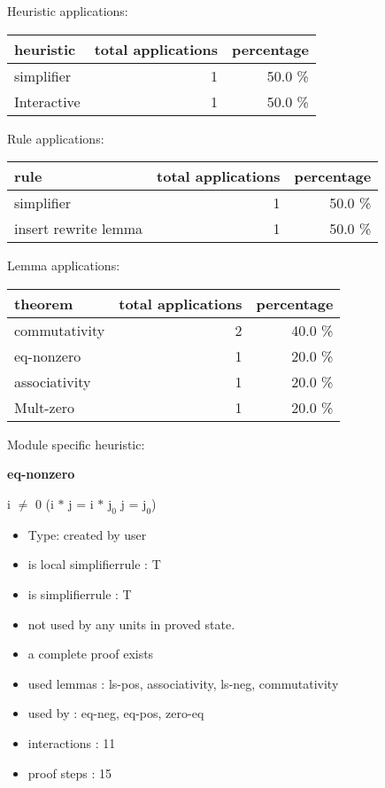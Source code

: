 \documentclass[a4paper]{article}
\begin{document}
\medskip


Heuristic applications:

\begin{supertabular}{l|r|r}
heuristic	& total applications & percentage \\ \hline
simplifier & 1 & 50.0 \% \\
Interactive & 1 & 50.0 \% \\

\end{supertabular}

Rule applications:

\begin{supertabular}{l|r|r}
rule	        & total applications & percentage \\ \hline
simplifier & 1 & 50.0 \% \\
insert rewrite lemma & 1 & 50.0 \% \\

\end{supertabular}

Lemma applications:

\begin{supertabular}{l|r|r}
theorem	        & total applications & percentage \\ \hline
commutativity & 2 & 40.0 \% \\
eq-nonzero & 1 & 20.0 \% \\
associativity & 1 & 20.0 \% \\
Mult-zero & 1 & 20.0 \% \\

\end{supertabular}

Module specific heuristic:

\pagebreak

{\LARGE\bf eq-nonzero}\label{lemma-eq-nonzero}

\medskip

 \Fol i $\neq$ 0 \Imp (i $*$ j = i $*$ $\mbox{j}_{0}$ \Equiv j = $\mbox{j}_{0}$)

\begin{itemize}

\item Type: created by user

\item is local simplifierrule : T
\item is simplifierrule : T
\item not used by any units in proved state.
\item       a complete proof exists
\item       used lemmas  : ls-pos, associativity, ls-neg, commutativity
\item       used by      : eq-neg, eq-pos, zero-eq
\item       interactions : 11
\item       proof steps  : 15
\end{itemize}
\end{document}
